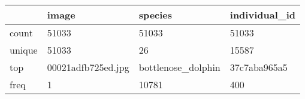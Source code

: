\begin{tabular}{llll}
\toprule
{} &               image &             species & individual\_id \\
\midrule
count  &               51033 &               51033 &         51033 \\
unique &               51033 &                  26 &         15587 \\
top    &  00021adfb725ed.jpg &  bottlenose\_dolphin &  37c7aba965a5 \\
freq   &                   1 &               10781 &           400 \\
\bottomrule
\end{tabular}
